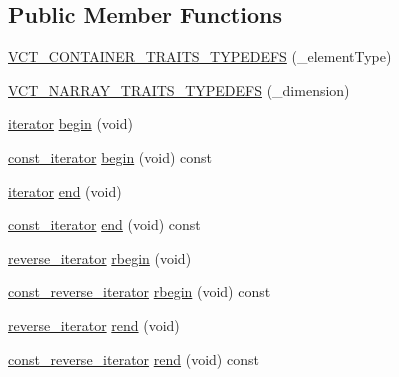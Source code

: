 \subsection*{Public Member Functions}
\begin{DoxyCompactItemize}
\item 
\hyperlink{classvct_dynamic_n_array_base_a914e933344f1f11d53ed819fb461c31f}{V\-C\-T\-\_\-\-C\-O\-N\-T\-A\-I\-N\-E\-R\-\_\-\-T\-R\-A\-I\-T\-S\-\_\-\-T\-Y\-P\-E\-D\-E\-F\-S} (\-\_\-element\-Type)
\item 
\hyperlink{classvct_dynamic_n_array_base_afd57de1af04b811a8f933667cf6bcd1b}{V\-C\-T\-\_\-\-N\-A\-R\-R\-A\-Y\-\_\-\-T\-R\-A\-I\-T\-S\-\_\-\-T\-Y\-P\-E\-D\-E\-F\-S} (\-\_\-dimension)
\item 
\hyperlink{classvct_dynamic_const_n_array_base_a0d7eee16dd05c2f5757640b3617cac5d}{iterator} \hyperlink{classvct_dynamic_n_array_base_a67f87d7c8b8de55f6d8c37cdb8c34616}{begin} (void)
\item 
\hyperlink{classvct_dynamic_const_n_array_base_a026881a1dc4be02626681c9c3056395b}{const\-\_\-iterator} \hyperlink{classvct_dynamic_n_array_base_a5e9bde5e66cfd5bb70ef14537e376b19}{begin} (void) const 
\item 
\hyperlink{classvct_dynamic_const_n_array_base_a0d7eee16dd05c2f5757640b3617cac5d}{iterator} \hyperlink{classvct_dynamic_n_array_base_a4449d8a38f5e620ee46bfdba4060a082}{end} (void)
\item 
\hyperlink{classvct_dynamic_const_n_array_base_a026881a1dc4be02626681c9c3056395b}{const\-\_\-iterator} \hyperlink{classvct_dynamic_n_array_base_af542ceb44a6df89eb0de59b6d1732a8a}{end} (void) const 
\item 
\hyperlink{classvct_dynamic_const_n_array_base_a028c350d6f74e002681cce4239dfdbc1}{reverse\-\_\-iterator} \hyperlink{classvct_dynamic_n_array_base_a1ff2b8db84927dc666d7e32e7ec9655e}{rbegin} (void)
\item 
\hyperlink{classvct_dynamic_const_n_array_base_a133cecf87f369296ad391ce3b697466b}{const\-\_\-reverse\-\_\-iterator} \hyperlink{classvct_dynamic_n_array_base_a25741a40be81855d110fc69e3794ba1d}{rbegin} (void) const 
\item 
\hyperlink{classvct_dynamic_const_n_array_base_a028c350d6f74e002681cce4239dfdbc1}{reverse\-\_\-iterator} \hyperlink{classvct_dynamic_n_array_base_a9ed53b7ec6842751b1a2ab00a1e1f240}{rend} (void)
\item 
\hyperlink{classvct_dynamic_const_n_array_base_a133cecf87f369296ad391ce3b697466b}{const\-\_\-reverse\-\_\-iterator} \hyperlink{classvct_dynamic_n_array_base_a48c84cbc9eb62b8323e1218ff657d3d7}{rend} (void) const 

\end{DoxyCompactItemize}
